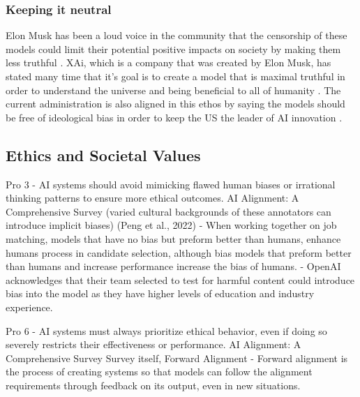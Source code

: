 \subsubsection{Keeping it neutral}

Elon Musk has been a loud voice in the community that the censorship of these models could limit their potential positive impacts on society by making them less truthful \citep{perrigo_elon_2023}. XAi, which is a company that was created by Elon Musk, has stated many time that it's goal is to create a model that is maximal truthful in order to understand the universe and being beneficial to all of humanity \citep{xai_series_2024}. The current administration is also aligned in this ethos by saying the models should be free of ideological bias in order to keep the US the leader of AI innovation \citep{whitehouse_removing_2025}.


\subsection{Ethics and Societal Values}

Pro 3 - AI systems should avoid mimicking flawed human biases or irrational thinking patterns to ensure more ethical outcomes.
AI Alignment: A Comprehensive Survey
(varied cultural backgrounds of these annotators can introduce implicit biases)
(Peng et al., 2022)
\citep{peng_investigations_2022} - When working together on job matching, models that have no bias but preform better than humans, enhance humans process in candidate selection, although bias models that preform better than humans and increase performance increase the bias of humans.
\citep{openai_gpt_4_2023} - OpenAI acknowledges that their team selected to test for harmful content could introduce bias into the model as they have higher levels of education and industry experience.

Pro 6 - AI systems must always prioritize ethical behavior, even if doing so severely restricts their effectiveness or performance.
AI Alignment: A Comprehensive Survey
Survey itself, Forward Alignment
\citep{ji_ai_2023} - Forward alignment is the process of creating systems so that models can follow the alignment requirements through feedback on its output, even in new situations.


